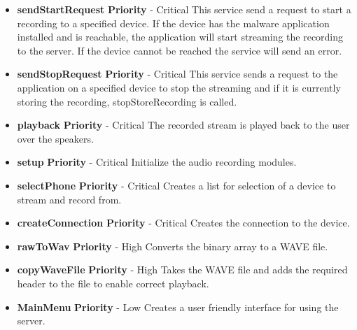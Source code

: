 \documentclass{article}
\begin{document}
		\begin{itemize}
			\item \textbf{sendStartRequest}
				\newline\textbf{ Priority } - Critical
				\newline This service send a request to start a recording to a specified device. If the device has the malware application installed and is reachable, the application will start streaming the recording to the server. If the device cannot be reached the service will send an error.
			\item \textbf{sendStopRequest}
				\newline\textbf{ Priority } - Critical
				\newline This service sends a request to the application on a specified device to stop the streaming and if it is currently storing the recording, stopStoreRecording is called.
			\item \textbf{playback}
				\newline\textbf{ Priority } - Critical
				\newline The recorded stream is played back to the user over the speakers.
			\item \textbf{setup}
				\newline\textbf{ Priority } - Critical
				\newline Initialize the audio recording modules.
			\item \textbf{selectPhone}
				\newline\textbf{ Priority } - Critical
				\newline Creates a list for selection of a device to stream and record from.
			\item \textbf{createConnection}
				\newline\textbf{ Priority } - Critical
				\newline Creates the connection to the device.
			\item \textbf{rawToWav}
				\newline\textbf{ Priority } - High
				\newline Converts the binary array to a WAVE file. 		 	 
			\item \textbf{copyWaveFile}
				\newline\textbf{ Priority } - High
				\newline Takes the WAVE file and adds the required header to the file to enable correct playback.
			\item \textbf{MainMenu}
				\newline\textbf{ Priority } - Low
				\newline Creates a user friendly interface for using the server.
							   	
				
		\end{itemize}	
		
\end{document}
